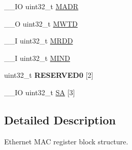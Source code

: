\begin{DoxyCompactItemize}
\+\_\+\+\_\+\+I\+O uint32\+\_\+t \hyperlink{struct_e_n_e_t___m_a_c___t_afc17c49a8ba00a4a4db6dc0b87d949b7}{M\+A\+D\+R}
\item 
\+\_\+\+\_\+\+O uint32\+\_\+t \hyperlink{struct_e_n_e_t___m_a_c___t_a588ac0beb769e9cabb7039582625a3e0}{M\+W\+T\+D}
\item 
\+\_\+\+\_\+\+I uint32\+\_\+t \hyperlink{struct_e_n_e_t___m_a_c___t_a98a3f303ec4276150d3d4b8586f2a71d}{M\+R\+D\+D}
\item 
\+\_\+\+\_\+\+I uint32\+\_\+t \hyperlink{struct_e_n_e_t___m_a_c___t_a6d107736b77b59d7188fb6faa04ea549}{M\+I\+N\+D}
\item 
\hypertarget{struct_e_n_e_t___m_a_c___t_a6e6d5f331b8f5ab0012d265d0a1ff6b1}{uint32\+\_\+t {\bfseries R\+E\+S\+E\+R\+V\+E\+D0} \mbox{[}2\mbox{]}}\label{struct_e_n_e_t___m_a_c___t_a6e6d5f331b8f5ab0012d265d0a1ff6b1}

\item 
\+\_\+\+\_\+\+I\+O uint32\+\_\+t \hyperlink{struct_e_n_e_t___m_a_c___t_a25214ef3698b23b87fea95b7158a11ad}{S\+A} \mbox{[}3\mbox{]}
\end{DoxyCompactItemize}


\subsection{Detailed Description}
Ethernet M\+A\+C register block structure. 

